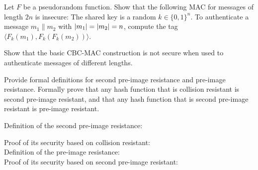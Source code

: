 \documentclass[12pt,letterpaper,boxed]{amspset}
\begin{document}

\begin{problem}[4.1]
Let $F$ be a pseudorandom function. Show that the following MAC for messages of length $2n$ is insecure: The shared key is a random $k\in \{0,1\}^n$. To authenticate a message $m_1\| m_2$ with $\lvert m_1\rvert=\lvert m_2\rvert=n$, compute the tag $\langle F_k(m_1), F_k(F_k(m_2))\rangle$. 
\end{problem}

\begin{solution}
\vspace{3cm}
\end{solution}

\begin{problem}[4.2]
Show that the basic CBC-MAC construction is not secure when used to authenticate messages of different lengths.
\end{problem}

\begin{solution}
\vspace{3cm}
\end{solution}

\begin{problem}[4.3]
Provide formal definitions for second pre-image resistance and pre-image resistance. Formally prove that any hash function that is collision resistant is second pre-image resistant, and that any hash function that is second pre-image resistant is pre-image resistant.
\end{problem}

\begin{solution}
Definition of the second pre-image resistance:

\vspace{5cm}
\noindent Proof of its security based on collision resistant:\\

\vspace{3cm}
\noindent Definition of the pre-image resistance:\\

\vspace{3cm}
\noindent Proof of its security based on second pre-image resistant:\\

\vspace{3cm}
\end{solution}
\end{document}
